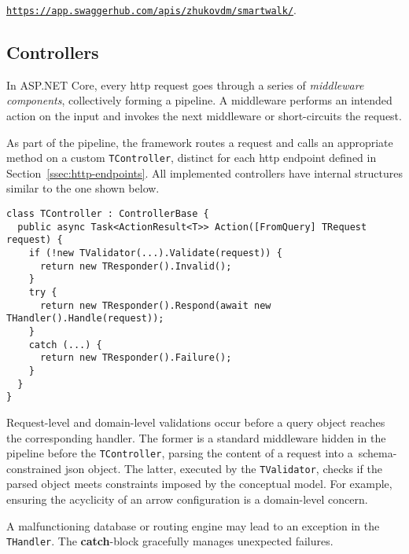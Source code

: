 \begin{center}
\texttt{\href{https://app.swaggerhub.com/apis/zhukovdm/smartwalk/}{https://app.swaggerhub.com/apis/zhukovdm/smartwalk/}}.
\end{center}

\subsection{Controllers}


In ASP.NET Core, every \acs{http} request goes through a series of \emph{middleware components}, collectively forming a pipeline. A middleware performs an intended action on the input and invokes the next middleware or short-circuits the request.

As part of the pipeline, the framework routes a request and calls an appropriate method on a custom \texttt{TController}, distinct for each \acs{http} endpoint defined in Section~\ref{ssec:http-endpoints}. All implemented controllers have internal structures similar to the one shown below.

\begin{verbatim}
class TController : ControllerBase {
  public async Task<ActionResult<T>> Action([FromQuery] TRequest request) {
    if (!new TValidator(...).Validate(request)) {
      return new TResponder().Invalid();
    }
    try {
      return new TResponder().Respond(await new THandler().Handle(request));
    }
    catch (...) {
      return new TResponder().Failure();
    }
  }
}
\end{verbatim}

Request-level and domain-level validations occur before a query object reaches the corresponding handler. The former is a standard middleware hidden in the pipeline before the \texttt{TController}, parsing the content of a request into a~schema-constrained \acs{json} object. The latter, executed by the \texttt{TValidator}, checks if the parsed object meets constraints imposed by the conceptual model. For example, ensuring the acyclicity of an arrow configuration is a domain-level concern.

A malfunctioning database or routing engine may lead to an exception in the \texttt{THandler}. The \textbf{catch}-block gracefully manages unexpected failures.

